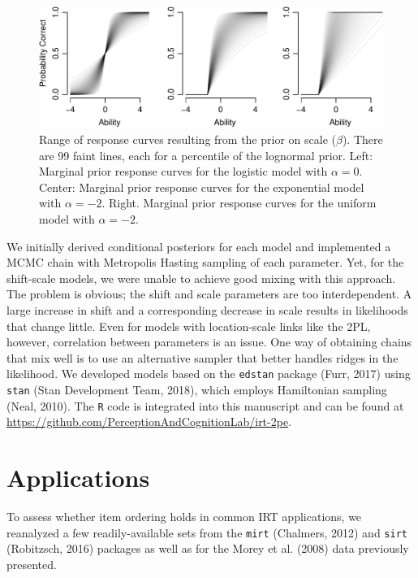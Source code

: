 \documentclass[english,,man]{apa6}
\begin{document}
\begin{figure}
\centering
\includegraphics{p_files/figure-latex/priorCurves-1.pdf}
\caption{\label{fig:priorCurves}Range of response curves resulting from the prior on scale (\(\beta\)). There are 99 faint lines, each for a percentile of the lognormal prior. Left: Marginal prior response curves for the logistic model with \(\alpha=0\). Center: Marginal prior response curves for the exponential model with \(\alpha=-2\). Right. Marginal prior response curves for the uniform model with \(\alpha=-2\).}
\end{figure}

We initially derived conditional posteriors for each model and implemented a MCMC chain with Metropolis Hasting sampling of each parameter. Yet, for the shift-scale models, we were unable to achieve good mixing with this approach. The problem is obvious; the shift and scale parameters are too interdependent. A large increase in shift and a corresponding decrease in scale results in likelihoods that change little. Even for models with location-scale links like the 2PL, however, correlation between parameters is an issue. One way of obtaining chains that mix well is to use an alternative sampler that better handles ridges in the likelihood. We developed models based on the \texttt{edstan} package (Furr, 2017) using \texttt{stan} (Stan Development Team, 2018), which employs Hamiltonian sampling (Neal, 2010). The \texttt{R} code is integrated into this manuscript and can be found at \url{https://github.com/PerceptionAndCognitionLab/irt-2pe}.

\hypertarget{applications}{%
\section{Applications}\label{applications}}

To assess whether item ordering holds in common IRT applications, we reanalyzed a few readily-available sets from the \texttt{mirt} (Chalmers, 2012) and \texttt{sirt} (Robitzsch, 2016) packages as well as for the Morey et al. (2008) data previously presented.
\end{document}

